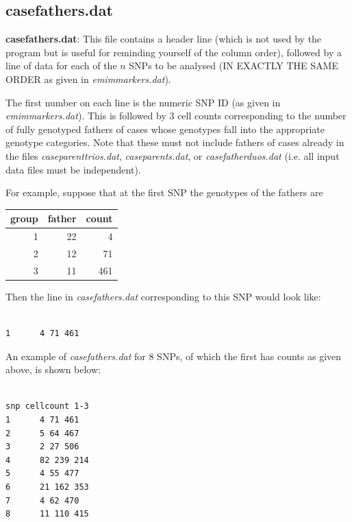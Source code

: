 \documentclass[a4paper,12pt]{article}
\begin{document}
\subsection{casefathers.dat}
\label{casefathers}

{\bf casefathers.dat}: This file contains a header line (which is not used by the program but is useful for reminding yourself of the column order), followed by a line of data for each of the $n$ SNPs to be analysed (IN EXACTLY THE SAME ORDER as given in {\it emimmarkers.dat}). 

The first number on each line is the numeric SNP ID (as given in {\it emimmarkers.dat}). This is followed by 3 cell counts corresponding to the number of fully genotyped fathers of cases whose genotypes fall into the appropriate genotype categories. Note that these must not include fathers of cases already in the files {\it caseparenttrios.dat}, {\it caseparents.dat}, or {\it casefatherduos.dat} (i.e. all input data files must be independent). 

For example, suppose that at the first SNP the genotypes of the fathers are 

{\begin{center}\begin{tabular}{rrr}
group  & father  & count\\
\hline
1  & 22  & 4\\
2  & 12  & 71\\
3  & 11  & 461\\
\end{tabular}\end{center}}

Then the line in {\it casefathers.dat} corresponding to this SNP would look like: 
\vspace{0.35cm} \begin{lstlisting}

1      4 71 461

\end{lstlisting} \vspace{0.35cm}
An example of {\it casefathers.dat} for 8 SNPs, of which the first has counts as given above, is shown below: 
\vspace{0.35cm} \begin{lstlisting}

snp cellcount 1-3
1      4 71 461
2      5 64 467
3      2 27 506
4      82 239 214
5      4 55 477
6      21 162 353
7      4 62 470
8      11 110 415

\end{lstlisting} \vspace{0.35cm}
\end{document}
